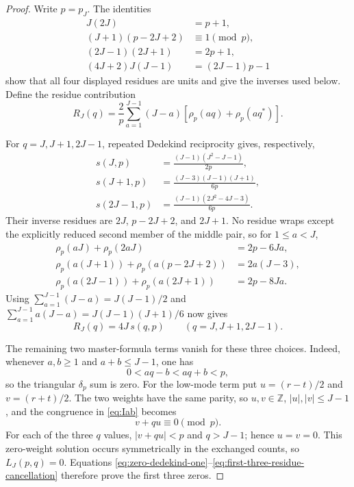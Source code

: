 \documentclass[11pt]{article}
\theoremstyle{definition}
\newcommand{\Z}{\mathbb Z}
\begin{document}
\begin{proof}
Write $p=p_J$.  The identities
\begin{align*}
 J(2J)&=p+1,\\
 (J+1)(p-2J+2)&\equiv1\pmod p,\\
 (2J-1)(2J+1)&=2p+1,\\
 (4J+2)J(J-1)&=(2J-1)p-1
\end{align*}
show that all four displayed residues are units and give the inverses used
below.  Define the residue contribution
\[
 R_J(q)=\frac2p\sum_{a=1}^{J-1}(J-a)
  [\rho_p(aq)+\rho_p(aq^*)].
\]

For $q=J,J+1,2J-1$, repeated Dedekind reciprocity gives, respectively,
\begin{align}
 s(J,p)&=\frac{(J-1)(J^2-J-1)}{2p},
 \label{eq:zero-dedekind-one}\\
 s(J+1,p)&=\frac{(J-3)(J-1)(J+1)}{6p},
 \label{eq:zero-dedekind-two}\\
 s(2J-1,p)&=\frac{(J-1)(2J^2-4J-3)}{6p}.
 \label{eq:zero-dedekind-three}
\end{align}
Their inverse residues are $2J$, $p-2J+2$, and $2J+1$.  No residue wraps
except the explicitly reduced second member of the middle pair, so for
$1\leq a<J$,
\begin{align*}
 \rho_p(aJ)+\rho_p(2aJ)&=2p-6Ja,\\
 \rho_p(a(J+1))+\rho_p(a(p-2J+2))&=2a(J-3),\\
 \rho_p(a(2J-1))+\rho_p(a(2J+1))&=2p-8Ja.
\end{align*}
Using
$\sum_{a=1}^{J-1}(J-a)=J(J-1)/2$ and
$\sum_{a=1}^{J-1}a(J-a)=J(J-1)(J+1)/6$ now gives
\begin{equation}
 R_J(q)=4J\,s(q,p)
 \qquad(q=J,J+1,2J-1).
 \label{eq:first-three-residue-cancellation}
\end{equation}

The remaining two master-formula terms vanish for these three choices.
Indeed, whenever $a,b\geq1$ and $a+b\leq J-1$, one has
\[
 0<aq-b<aq+b<p,
\]
so the triangular $\delta_p$ sum is zero.  For the low-mode term put
$u=(r-t)/2$ and $v=(r+t)/2$.  The two weights have the same parity, so
$u,v\in\Z$, $|u|,|v|\leq J-1$, and the congruence in \eqref{eq:Iab} becomes
\[
 v+qu\equiv0\pmod p.
\]
For each of the three $q$ values, $|v+qu|<p$ and $q>J-1$; hence
$u=v=0$.  This zero-weight solution occurs symmetrically in the exchanged
counts, so $L_J(p,q)=0$.  Equations
\eqref{eq:zero-dedekind-one}--\eqref{eq:first-three-residue-cancellation}
therefore prove the first three zeros.


\end{proof}
\end{document}

